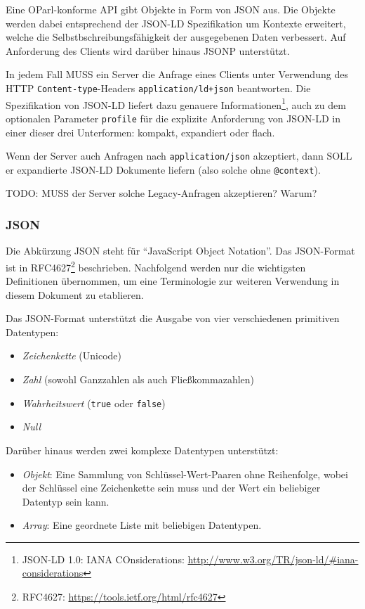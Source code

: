 \documentclass[,a4paper]{article}
\begin{document}
Eine OParl-konforme API gibt Objekte in Form von JSON aus. Die Objekte
werden dabei entsprechend der JSON-LD Spezifikation um Kontexte
erweitert, welche die Selbstbschreibungsfähigkeit der ausgegebenen Daten
verbessert. Auf Anforderung des Clients wird darüber hinaus JSONP
unterstützt.

In jedem Fall MUSS ein Server die Anfrage eines Clients unter Verwendung
des HTTP \texttt{Content-type}-Headers \texttt{application/ld+json}
beantworten. Die Spezifikation von JSON-LD liefert dazu genauere
Informationen\footnote{JSON-LD 1.0: IANA COnsiderations:
  \url{http://www.w3.org/TR/json-ld/\#iana-considerations}}, auch zu dem
optionalen Parameter \texttt{profile} für die explizite Anforderung von
JSON-LD in einer dieser drei Unterformen: kompakt, expandiert oder
flach.

Wenn der Server auch Anfragen nach \texttt{application/json} akzeptiert,
dann SOLL er expandierte JSON-LD Dokumente liefern (also solche ohne
\texttt{@context}).

TODO: MUSS der Server solche Legacy-Anfragen akzeptieren? Warum?

\subsubsection{JSON}\label{json}

Die Abkürzung JSON steht für ``JavaScript Object Notation''. Das
JSON-Format ist in RFC4627\footnote{RFC4627:
  \url{https://tools.ietf.org/html/rfc4627}} beschrieben. Nachfolgend
werden nur die wichtigsten Definitionen übernommen, um eine Terminologie
zur weiteren Verwendung in diesem Dokument zu etablieren.

Das JSON-Format unterstützt die Ausgabe von vier verschiedenen
primitiven Datentypen:

\begin{itemize}
\itemsep1pt\parskip0pt
\item
  \emph{Zeichenkette} (Unicode)
\item
  \emph{Zahl} (sowohl Ganzzahlen als auch Fließkommazahlen)
\item
  \emph{Wahrheitswert} (\texttt{true} oder \texttt{false})
\item
  \emph{Null}
\end{itemize}

Darüber hinaus werden zwei komplexe Datentypen unterstützt:

\begin{itemize}
\itemsep1pt\parskip0pt
\item
  \emph{Objekt}: Eine Sammlung von Schlüssel-Wert-Paaren ohne
  Reihenfolge, wobei der Schlüssel eine Zeichenkette sein muss und der
  Wert ein beliebiger Datentyp sein kann.
\item
  \emph{Array}: Eine geordnete Liste mit beliebigen Datentypen.
\end{itemize}
\end{document}
